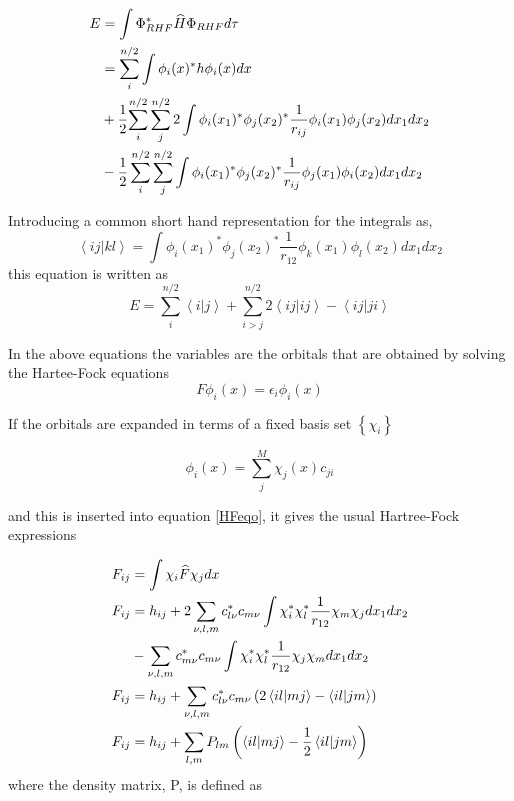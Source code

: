 \begin{align}
E & = \int {\Phi^*_{RHF} \widehat{H} \Phi_{RHF} d\tau } \\
  & =  \sum_i^{n/2}{\int{\phi_i(x)^*h\phi_i(x)dx}} \notag \\
  & + \frac{1}{2}{\sum_i^{n/2}{\sum_j^{n/2}{2\int{\phi_i(x_1)^*\phi_j(x_2)^*\frac{1}{r_{ij}}\phi_i(x_1)\phi_j(x_2)dx_1dx_2}}}}  \label{HFeqo} \\
  & -  \frac{1}{2}\sum_i^{n/2}\sum_j^{n/2}{\int{\phi_i(x_1)^*\phi_j(x_2)^*\frac{1}{r_{ij}}\phi_j(x_1)\phi_i(x_2)dx_1dx_2}} \notag
\end{align}


Introducing a common short hand representation for the integrals as,
\begin{equation}
   \left\langle i j | k l \right\rangle = \int{ \phi_i(x_1)^*\phi_j(x_2)^*\frac{1}{r_{12}}\phi_k(x_1)\phi_l(x_2)dx_1dx_2 }
\end{equation}
 this equation is written as
\begin{equation}
E = \sum_i^{n/2}{\left\langle i | j \right\rangle} + \sum_{i>j}^{n/2}{2\left\langle ij|ij\right\rangle 
 - \left\langle i j | j i \right\rangle }
\end{equation}

  In the above equations the variables are the orbitals that are obtained by solving the Hartee-Fock equations
\begin{equation}
    F \phi_i(x) = \epsilon_i \phi_i(x)
\end{equation}
  
  
If the orbitals are expanded in terms of a fixed basis set $ \left\{\chi_i\right\} $
  
\begin{equation}
   \phi_i(x) = \sum_j^M{\chi_j(x) c_{ji}}
\end{equation}

and this is inserted into equation \ref{HFeqo}, it gives the usual Hartree-Fock expressions

\begin{align}
F_{ij} & =  \int{\chi_i \widehat{F} \chi_j dx} \\
F_{ij} & =  h_{ij} + 2\sum_{\nu,l,m} {c_{l\nu}^* c_{m\nu} \int {\chi_i^* \chi_l^* \frac{1}{r_{12}} \chi_m \chi_j dx_1 dx_2}} \notag \\
       & - \sum_{\nu,l,m} {c_{m\nu}^* c_{m\nu} \int {\chi_i^* \chi_l^* \frac{1}{r_{12}} \chi_j \chi_m dx_1 dx_2} } \\
F_{ij} & =  h_{ij} + \sum_{\nu,l,m} {c_{l\nu}^* c_{m\nu}\left(2 \left\langle i l | m j \right\rangle - \left\langle i l | j m \right\rangle \right) }  \\
F_{ij} & =  h_{ij} + \sum_{l,m} {P_{lm} \left( \left\langle i l | m j \right\rangle - \frac{1}{2}\left\langle i l | j m \right\rangle \right)}
\end{align}
where the density matrix, P, is defined as

